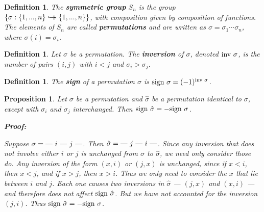 \documentclass{article}
\theoremstyle{colontheorem}
\newtheorem{proposition}[theorem]{Proposition}
\newtheorem{definition}[theorem]{Definition}
\newenvironment{Proposition}
{
	\begin{mdframed}[backgroundcolor=TheoremOrange!10]
	\begin{proposition}
}
{
	\end{proposition}
	\end{mdframed}
	
	\vspace{.15in}
}
\newenvironment{Def}
{
	\begin{mdframed}[backgroundcolor=DefGreen!10]
	\begin{definition}
}
{
	\end{definition}
	\end{mdframed}
	
	\vspace{.15in}
}
\newenvironment{Proof}
{
	\begin{mdframed}[backgroundcolor=ProofPurple!10]
	\textbf{Proof:}%
}
{
	\end{mdframed}
	
	\vspace{.085in}
}
\begin{document}
\begin{Def}
	
	The \textbf{symmetric group} $S_n$ is the group $\{\sigma : \{1, ..., n\} \hookrightarrow\mathrel{\mspace{-15mu}}\rightarrow \{1, ..., n\} \}$, with composition given by composition of functions. The elements of $S_n$ are called \textbf{permutations} and are written as $\sigma = \sigma_1 \cdots \sigma_n$, where $\sigma(i) = \sigma_i$.
	
\end{Def}



\begin{Def}
	
	Let $\sigma$ be a permutation. The \textbf{inversion} of $\sigma$, denoted $\textnormal{inv }\sigma$, is the number of pairs $(i, j)$ with $i < j$ and $\sigma_i > \sigma_j.$
	
\end{Def}



\begin{Def}
	
	The \textbf{sign} of a permutation $\sigma$ is $\textnormal{sign }\sigma = (-1)^{\textnormal{inv }\sigma}$.
	
\end{Def}



\begin{Proposition}
	
	Let $\sigma$ be a permutation and $\hat{\sigma}$ be a permutation identical to $\sigma$, except with $\sigma_i$ and $\sigma_j$ interchanged. Then $\textnormal{sign } \hat{\sigma} = -\textnormal{sign } \sigma$.
	
	\begin{Proof}
		Suppose $\sigma = \textnormal{--- } i \textnormal{ --- } j \textnormal{ ---}$. Then $\hat{\sigma} = \textnormal{--- } j \textnormal{ --- } i \textnormal{ ---}$. Since any inversion that does not involve either $i$ or $j$ is unchanged from $\sigma$ to $\hat{\sigma}$, we need only consider those do. Any inversion of the form $(x, i)$ or $(j, x)$ is unchanged, since if $x < i$, then $x < j$, and if $x > j$, then $x > i$. Thus we only need to consider the $x$ that lie between $i$ and $j$. Each one causes two inversions in $\hat{\sigma}$ --- $(j, x)$ and $(x, i)$ --- and therefore does not affect $\textnormal{sign } \hat{\sigma}$. But we have not accounted for the inversion $(j, i)$. Thus $\textnormal{sign } \hat{\sigma} = -\textnormal{sign } \sigma$.
		
	\end{Proof}
	
\end{Proposition}
\end{document}
